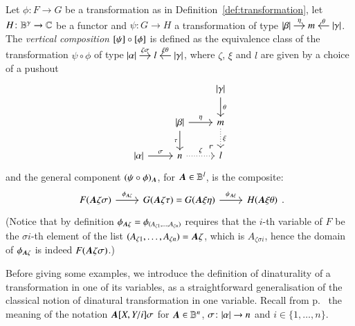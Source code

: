 \begin{definition}\label{def:vertical composition}
	Let $\phi \colon F \to G$ be a transformation as in Definition~\ref{def:transformation}, let $H \colon \mathbb B^\gamma \to \mathbb C$ be a functor and $\psi \colon G \to H$ a transformation of type
	$
	\begin{tikzcd}[cramped,sep=small]
	\length\beta \ar[r,"\eta"] & m & \ar[l,"\theta"'] \length\gamma
	\end{tikzcd}
	$. The \emph{vertical composition} $\class\psi \circ \class\phi$ is defined as the equivalence class of the transformation $\psi\circ\phi$ of type
	$
	\begin{tikzcd}[cramped,sep=small]
	\length\alpha \ar[r,"\zeta\sigma"] & l & \ar[l,"\xi\theta"'] \length\gamma
	\end{tikzcd}
	$,
	where $\zeta$, $\xi$ and $l$ are given by a choice of a pushout
	\begin{equation}\label{eqn:pushout composite type}
	\begin{tikzcd}
	& & \length\gamma \ar[d,"\theta"] \\
	& \length\beta \ar[d,"\tau"'] \ar[r,"\eta"] \ar[dr,phantom,very near end,"\ulcorner"] & m \ar[d,"\xi",dotted] \\
	\length\alpha \ar[r,"\sigma"] & n \ar[r,"\zeta",dotted] & l
	\end{tikzcd}
	\end{equation}
	and the general component $(\psi\circ\phi)_{\bfA}$, for ${\boldsymbol A} \in \mathbb B^l$, is the composite:
	\[
	\begin{tikzcd}
	F(\bfA\zeta\sigma) \ar[r,"\phi_{\bfA\zeta}"] & G(\bfA\zeta\tau)=G(\bfA\xi\eta) \ar[r,"\psi_{\bfA\xi}"] & H(\bfA\xi\theta)
	\end{tikzcd}.
	\]
	(Notice that by definition $\phi_{\bfA\zeta} = \phi_{(A_{\zeta1},\dots,A_{\zeta n})}$ requires that the $i$-th variable of $F$ be the $\sigma i$-th element of the list $(A_{\zeta1},\dots,A_{\zeta n})={\boldsymbol A}\zeta$, which is $A_{\zeta\sigma i}$, hence the domain of $\phi_{\bfA\zeta}$ is indeed $F({\boldsymbol A}\zeta\sigma)$.)
\end{definition}

Before giving some examples, we introduce the definition of dinaturality of a transformation in one of its variables, as a straightforward generalisation of the classical notion of dinatural transformation in one variable. Recall from p.~\pageref{not:A[X,Y/i]sigma} the meaning of the notation ${{\boldsymbol{{\boldsymbol A}}}[X,Y / i]} \sigma$ for ${\boldsymbol A}\in\mathbb B^n$, $\sigma \colon \lvert \alpha \rvert \to n$ and $i \in \{1,\dots,n\}$.

